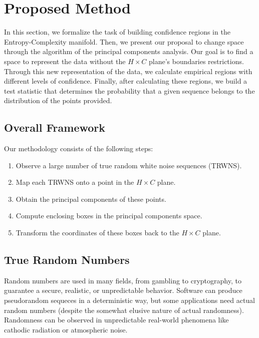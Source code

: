 \documentclass[alpha-refs]{wiley-article}
\begin{document}
\section{Proposed Method}\label{Sec:Proposal}

In this section, we formalize the task of building confidence regions in the Entropy-Complexity manifold.
Then, we present our proposal to change space through the algorithm of the principal components analysis.
Our goal is to find a space to represent the data without the $H\times C$ plane's boundaries restrictions.
Through this new representation of the data, we calculate empirical regions with different levels of confidence.
Finally, after calculating these regions, we build a test statistic that determines the probability that a given sequence belongs to the distribution of the points provided.

\subsection{Overall Framework}\label{Sec:OverallFramework}

Our methodology consists of the following steps:
\begin{enumerate}
	\item\label{item:Methodology1} Observe a large number of true random white noise sequences (TRWNS).
	\item\label{item:Methodology2} Map each TRWNS onto a point in the $H\times C$ plane.
	\item\label{item:Methodology3} Obtain the principal components of these points.
	\item\label{item:Methodology4} Compute enclosing boxes in the principal components space.
	\item\label{item:Methodology5} Transform the coordinates of these boxes back to the $H\times C$ plane.
\end{enumerate}

\subsection{True Random Numbers}\label{Sec:TRNG}

Random numbers are used in many fields, from gambling to cryptography, to guarantee a secure, realistic, or unpredictable behavior. 
Software can produce pseudorandom sequeces in a deterministic way, but some applications need actual random numbers (despite the somewhat elusive nature of actual randomness).
Randomness can be observed in unpredictable real-world phenomena like cathodic radiation or atmospheric noise.
\end{document}

